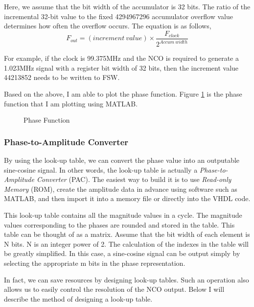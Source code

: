 Here, we assume that the bit width of the accumulator is 32 bits. The ratio of the incremental 32-bit value to the fixed \num{4294967296} accumulator overflow value determines how often the overflow occurs. The equation is as follows,
\begin{equation}
    F_{out} = (increment\ value) \times \frac{F_{clock}}{2^{Accum\ width}}
    \label{equ:nco}
\end{equation}

For example, if the clock is 99.375MHz and the NCO is required to generate a 1.023MHz signal with a register bit width of 32 bits, then the increment value \num{44213852} needs to be written to FSW.

Based on the above, I am able to plot the phase function. Figure \ref{fig:phase_function} is the phase function that I am plotting using MATLAB.

\begin{figure}[!htbp]
    \centering
    
    \caption{Phase Function}
    \label{fig:phase_function}
\end{figure}

\subsubsection{Phase-to-Amplitude Converter}
By using the look-up table, we can convert the phase value into an outputable sine-cosine signal. In other words, the look-up table is actually a \textit{Phase-to-Amplitude Converter} (PAC). The easiest way to build it is to use \textit{Read-only Memory} (ROM)\cite{RN190}, create the amplitude data in advance using software such as MATLAB, and then import it into a memory file or directly into the VHDL code.

This look-up table contains all the magnitude values in a cycle. The magnitude values corresponding to the phases are rounded and stored in the table. This table can be thought of as a matrix. Assume that the bit width of each element is N bits. N is an integer power of 2. The calculation of the indexes in the table will be greatly simplified\cite{RN194}. In this case, a sine-cosine signal can be output simply by selecting the appropriate m bits in the phase representation.

In fact, we can save resources by  designing look-up tables\cite{RN193}. Such an operation also allows us to easily control the resolution of the NCO output. Below I will describe the method of designing a look-up table.

